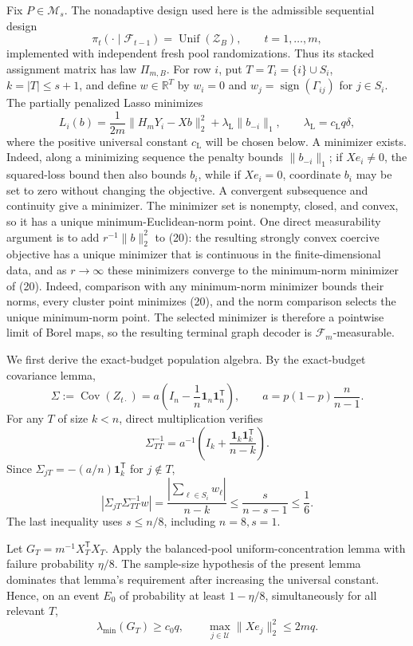 Fix \(P\in\mathcal M_s\).  The nonadaptive design used here is the admissible sequential design
\[
 \pi_t(\cdot\mid\mathcal F_{t-1})=\operatorname{Unif}(\mathcal Z_B),
 \qquad t=1,\ldots,m, \tag{19}
\]
implemented with independent fresh pool randomizations.  Thus its stacked assignment matrix has law \(\Pi_{m,B}\).  For row \(i\), put \(T=T_i=\{i\}\cup S_i\), \(k=|T|\le s+1\), and define \(w\in\mathbb R^T\) by \(w_i=0\) and \(w_j=\operatorname{sign}(\Gamma_{ij})\) for \(j\in S_i\).  The partially penalized Lasso minimizes
\[
 L_i(b)=\frac1{2m}\lVert H_mY_i-Xb\rVert_2^2
       +\lambda_{\mathrm L}\lVert b_{-i}\rVert_1,
 \qquad \lambda_{\mathrm L}=c_{\mathrm L}q\delta, \tag{20}
\]
where the positive universal constant \(c_{\mathrm L}\) will be chosen below.  A minimizer exists.  Indeed, along a minimizing sequence the penalty bounds \(\lVert b_{-i}\rVert_1\); if \(Xe_i\ne0\), the squared-loss bound then also bounds \(b_i\), while if \(Xe_i=0\), coordinate \(b_i\) may be set to zero without changing the objective.  A convergent subsequence and continuity give a minimizer.  The minimizer set is nonempty, closed, and convex, so it has a unique minimum-Euclidean-norm point.  One direct measurability argument is to add \(r^{-1}\lVert b\rVert_2^2\) to (20): the resulting strongly convex coercive objective has a unique minimizer that is continuous in the finite-dimensional data, and as \(r\to\infty\) these minimizers converge to the minimum-norm minimizer of (20).  Indeed, comparison with any minimum-norm minimizer bounds their norms, every cluster point minimizes (20), and the norm comparison selects the unique minimum-norm point.  The selected minimizer is therefore a pointwise limit of Borel maps, so the resulting terminal graph decoder is \(\mathcal F_m\)-measurable.

We first derive the exact-budget population algebra.  By the exact-budget covariance lemma,
\[
 \Sigma:=\operatorname{Cov}(Z_{t\cdot})
 =a\left(I_n-\frac1n\mathbf1_n\mathbf1_n^{\mathsf T}\right),
 \qquad a=p(1-p)\frac n{n-1}. \tag{21}
\]
For any \(T\) of size \(k<n\), direct multiplication verifies
\[
 \Sigma_{TT}^{-1}=a^{-1}\left(I_k+\frac{\mathbf1_k\mathbf1_k^{\mathsf T}}{n-k}\right). \tag{22}
\]
Since \(\Sigma_{jT}=-(a/n)\mathbf1_k^{\mathsf T}\) for \(j\notin T\),
\[
 \left|\Sigma_{jT}\Sigma_{TT}^{-1}w\right|
 =\frac{|\sum_{\ell\in S_i}w_\ell|}{n-k}
 \le\frac{s}{n-s-1}\le\frac16. \tag{23}
\]
The last inequality uses \(s\le n/8\), including \(n=8,s=1\).

Let \(G_T=m^{-1}X_T^{\mathsf T}X_T\).  Apply the balanced-pool uniform-concentration lemma with failure probability \(\eta/8\).  The sample-size hypothesis of the present lemma dominates that lemma's requirement after increasing the universal constant.  Hence, on an event \(E_0\) of probability at least \(1-\eta/8\), simultaneously for all relevant \(T\),
\[
 \lambda_{\min}(G_T)\ge c_0q,
 \qquad \max_{j\in\mathcal U}\lVert Xe_j\rVert_2^2\le2mq. \tag{24}
\]

